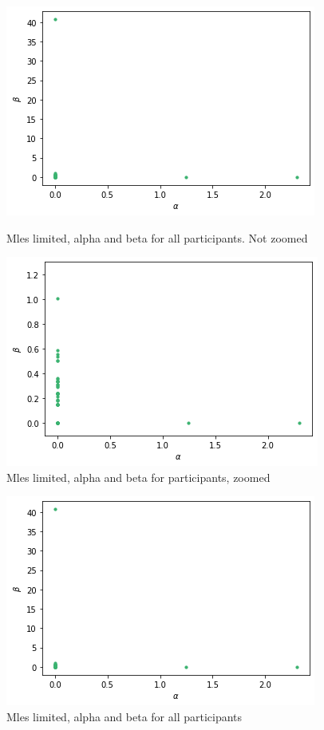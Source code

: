 \begin{figure}
    \centering
    \begin{minipage}{0.48\textwidth}
        \centering
        \includegraphics[scale=0.38]{pictures/plotted_mles_limited_alpha_beta_gk1.png}
        \caption{Mles limited, alpha and beta for all participants. Not zoomed}
        \label{fig:mles_limited_alpha_beta}
    \end{minipage}\hspace{0.2cm}%
    \begin{minipage}{0.48\textwidth}
        \centering
        \includegraphics[scale=0.38]{pictures/plotted_mles_limited_alpha_beta_zoomed_gk1.png}
        \caption{Mles limited, alpha and beta for participants, zoomed}
        \label{fig:mles_limited_alpha_beta_zoomed}
    \end{minipage}
\end{figure}


\begin{figure}
    \centering
    \includegraphics[scale=0.7]{pictures/plotted_mles_limited_alpha_beta_gk1.png}
    \caption{Mles limited, alpha and beta for all participants}
    \label{fig:mles_limited_alpha_beta}
\end{figure}

